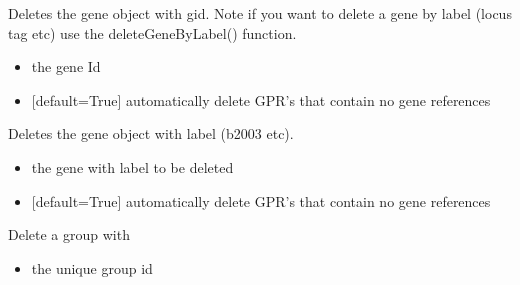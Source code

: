 \documentclass[letterpaper,10pt,english]{sphinxmanual}
\begin{document}
\begin{fulllineitems}
\begin{fulllineitems}
\label{\detokenize{modules_doc:cbmpy.CBModel.Model.deleteGene}}
\pysigstartsignatures
{}
\pysigstopsignatures
\sphinxAtStartPar
Deletes the gene object with gid. Note if you want to delete a gene by label (locus tag etc)
use the deleteGeneByLabel() function.
\begin{itemize}
\item {} 
\sphinxAtStartPar
{} the gene Id

\item {} 
\sphinxAtStartPar
{} {[}default=True{]} automatically delete GPR’s that contain no gene references

\end{itemize}

\end{fulllineitems}


\begin{fulllineitems}
\label{\detokenize{modules_doc:cbmpy.CBModel.Model.deleteGeneByLabel}}
\pysigstartsignatures
{}
\pysigstopsignatures
\sphinxAtStartPar
Deletes the gene object with label (b2003 etc).
\begin{itemize}
\item {} 
\sphinxAtStartPar
{} the gene with label to be deleted

\item {} 
\sphinxAtStartPar
{} {[}default=True{]} automatically delete GPR’s that contain no gene references

\end{itemize}

\end{fulllineitems}


\begin{fulllineitems}
\label{\detokenize{modules_doc:cbmpy.CBModel.Model.deleteGroup}}
\pysigstartsignatures
{}
\pysigstopsignatures
\sphinxAtStartPar
Delete a group with
\begin{itemize}
\item {} 
\sphinxAtStartPar
{} the unique group id


\end{itemize}
\end{fulllineitems}
\end{fulllineitems}
\end{document}
